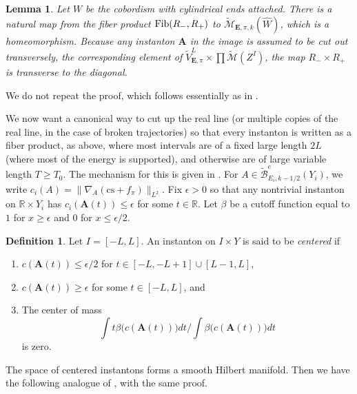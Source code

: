 \documentclass{memo-l}
\newtheorem{lemma}[theorem]{Lemma}
\theoremstyle{definition}
\newtheorem{definition}[theorem]{Definition}
\theoremstyle{remark}
\numberwithin{section}{chapter}
\numberwithin{equation}{chapter}
\begin{document}
\begin{lemma}\label{fibertest}Let $W$ be the cobordism with cylindrical ends attached. There is a natural map from the fiber product $\textup{Fib}(R_-, R_+)$ to $\widetilde{\mathcal M}_{\mathbf{E},\pi,k}(\hat W)$, which is a homeomorphism. Because any instanton $\mathbf{A}$ in the image is assumed to be cut out transversely, the corresponding element of $\widetilde{V}^L_{\mathbf{E},\pi} \times \prod \widetilde{\mathcal M}(Z^I)$, the map $R_- \times R_+$ is transverse to the diagonal.
\end{lemma}
We do not repeat the proof, which follows essentially as in \cite[Theorem~19.1.4]{KMSW}.

We now want a canonical way to cut up the real line (or multiple copies of the real line, in the case of broken trajectories) so that every instanton is written as a fiber product, as above, where most intervals are of a fixed large length $2L$ (where most of the energy is supported), and otherwise are of large variable length $T \geq T_0$. The mechanism for this is given in \cite[Section~19.2]{KMSW}. For $A \in \widetilde{\mathcal B}^e_{E_i,k-1/2}(Y_i)$, we write $c_i(A) = \|\nabla_A(\text{cs}+f_\pi)\|_{L^2}$.
Fix $\epsilon > 0$ so that any nontrivial instanton on $\mathbb R \times Y_i$ has $c_i(\mathbf{A}(t)) \leq \epsilon$ for some $t \in \mathbb R$. Let $\beta$ be a cutoff function equal to $1$ for $x \geq \epsilon$ and $0$ for $x \leq \epsilon/2$.

\begin{definition}Let $I = [-L, L]$. An instanton on $I \times Y$ is said to be \emph{centered} if
\begin{enumerate}
\item $c(\mathbf{A}(t)) \leq \epsilon/2$ for $t \in [-L, -L+1] \cup [L-1, L]$, \\
\item $c(\mathbf{A}(t)) \geq \epsilon$ for some $t \in [-L, L]$, and\\
\item The center of mass $$\int t \beta\big(c(\mathbf{A}(t))\big) dt \Big/ \int \beta\big(c(\mathbf{A}(t))\big) dt$$ is zero.
\end{enumerate}
\end{definition}

The space of centered instantons forms a smooth Hilbert manifold. Then we have the following analogue of \cite[Proposition~24.7.3]{KMSW}, with the same proof.
\end{document}
